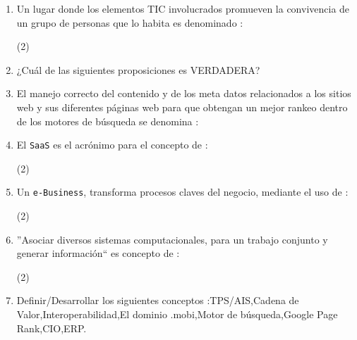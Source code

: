 \documentclass[10pt, a4paper]{article}
\begin{document}
\begin{enumerate}
{}
\item{Un lugar donde los elementos TIC involucrados promueven la convivencia de un grupo de personas que lo habita es denominado : 
\begin{tasks}(2)
\end{tasks}
}
\item{¿Cuál de las siguientes proposiciones es VERDADERA?
\begin{tasks}
\end{tasks}
}
\item{El manejo correcto del contenido y de los meta datos relacionados a los sitios web y sus diferentes páginas web para que obtengan un mejor rankeo dentro de los motores de búsqueda se denomina :
\begin{tasks}
\end{tasks}
}
\item{El {\tt SaaS} es el acrónimo para el concepto de :
\begin{tasks}(2)
\end{tasks}
}
\item{Un {\tt e-Business}, transforma procesos claves del negocio, mediante el uso de :
\begin{tasks}(2)
\end{tasks}
}
\item{''Asociar diversos sistemas computacionales, para un trabajo conjunto y generar información`` es concepto de :
\begin{tasks}(2)
\end{tasks}
}
\item{ Definir/Desarrollar los siguientes conceptos :\quad TPS/AIS,\quad Cadena de Valor,\quad Interoperabilidad,\quad El dominio .mobi,\quad Motor de búsqueda,\quad Google Page Rank,\quad CIO,\quad ERP.
}
\end{enumerate}
\end{document}
